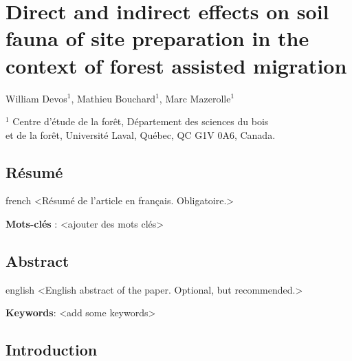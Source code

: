 \chapter{Direct and indirect effects on soil fauna of site preparation in the context of forest assisted migration}     %
\label{chapitre1-articles}    

William Devos$^1$, Mathieu Bouchard$^1$, Marc Mazerolle$^1$

$^1$ Centre d'étude de la forêt, Département des sciences du bois \\ 
et de la forêt, Université Laval, Québec, QC G1V 0A6, Canada. \\ 

\clearpage

\section*{Résumé}
\label{sec:resume1}

\begin{otherlanguage*}{french}
  <Résumé de l'article en français. Obligatoire.>

  \textbf{Mots-clés} : <ajouter des mots clés>
\end{otherlanguage*}

\clearpage

\section*{Abstract}
\label{sec:abstract1}

\begin{otherlanguage*}{english}
  <English abstract of the paper. Optional, but recommended.>

\textbf{Keywords}: <add some keywords> 
\end{otherlanguage*}

\cleardoublepage

\section*{Introduction}
\label{sec:intro1}



